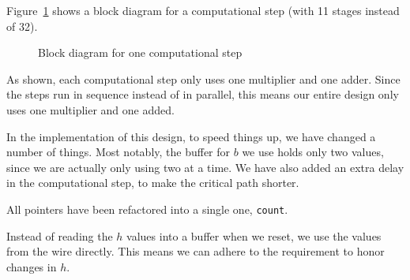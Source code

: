 Figure~\ref{fig:design:compstep} shows a block diagram for a computational step (with 11 stages instead of 32).

\begin{figure}[h]
	\centering
	\def\svgwidth{0.6\textwidth}
	
	\caption{Block diagram for one computational step}
	\label{fig:design:compstep}
\end{figure}

As shown, each computational step only uses one multiplier and one adder.
Since the steps run in sequence instead of in parallel, this means our entire design only uses one multiplier and one added.

In the implementation of this design, to speed things up, we have changed a number of things.
Most notably, the buffer for $b$ we use holds only two values, since we are actually only using two at a time.
We have also added an extra delay in the computational step, to make the critical path shorter.

All pointers have been refactored into a single one, \texttt{count}.

Instead of reading the $h$ values into a buffer when we reset, we use the values from the wire directly.
This means we can adhere to the requirement to honor changes in $h$.

\strengthfilter
